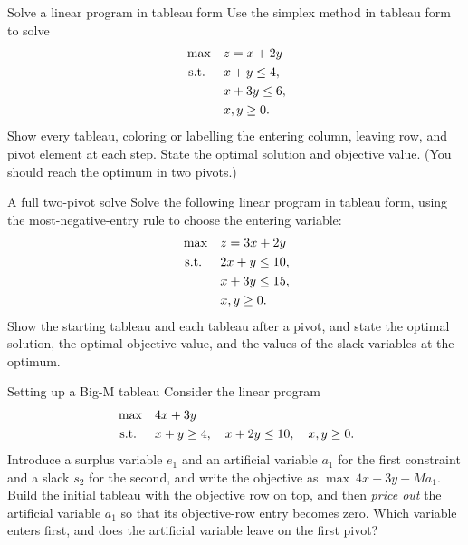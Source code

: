 \begin{ex}{Solve a linear program in tableau form}{}
\label{ex:tableau-solve-lp}
 Use the simplex method in tableau form to solve
\[
\begin{aligned}
\max\quad & z = x + 2y\\
\text{ s.t. }\quad  & x + y  \le 4,\\
          & x + 3y \le 6,\\
          & x, y \ge 0.
\end{aligned}
\]
Show every tableau, coloring or labelling the entering column, leaving row, and pivot element at each step. State the optimal solution and objective value. (You should reach the optimum in two pivots.)
\exrefs{\S\ref{sec:tableau-pivot}; \S\ref{sec:tableau-optimality}}
\end{ex}

\begin{ex}{A full two-pivot solve}{}
\label{ex:tableau-two-pivot-solve}
 Solve the following linear program in tableau form, using the most-negative-entry rule to choose the entering variable:
\[
\begin{aligned}
\max\quad & z = 3x + 2y\\
\text{ s.t. }\quad  & 2x + y  \le 10,\\
          & x + 3y \le 15,\\
          & x, y \ge 0.
\end{aligned}
\]
Show the starting tableau and each tableau after a pivot, and state the optimal solution, the optimal objective value, and the values of the slack variables at the optimum.
\exrefs{\S\ref{sec:tableau-pivot}; \S\ref{sec:tableau-optimality}}
\end{ex}

\begin{ex}{Setting up a Big-M tableau}{}
\label{ex:tableau-bigm-setup}
 Consider the linear program
\[
\begin{aligned}
\max\quad & 4x + 3y \\
\text{ s.t. }\quad  & x + y \ge 4,\quad x + 2y \le 10,\quad x,y \ge 0.
\end{aligned}
\]
Introduce a surplus variable $e_1$ and an artificial variable $a_1$ for the first constraint and a slack $s_2$ for the second, and write the objective as $\max\ 4x + 3y - M a_1$. Build the initial tableau with the objective row on top, and then \emph{price out} the artificial variable $a_1$ so that its objective-row entry becomes zero. Which variable enters first, and does the artificial variable leave on the first pivot?
\exrefs{\S\ref{sec:tableau-bigm}}
\end{ex}

